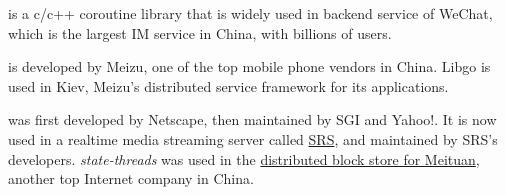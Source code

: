 \cite{libco} is a c/c++ coroutine library that
is widely used in backend service of WeChat, which is the largest IM service
in China, with billions of users. 

\uabschnitt{\libgo}\cite{libgo} is developed by Meizu, one of the top mobile
phone vendors in China. Libgo is used in Kiev, Meizu's distributed service
framework for its applications.

\uabschnitt{\statethreads}\cite{state-threads} was first developed by
Netscape, then maintained by SGI and Yahoo!. It is now used in a realtime
media streaming server called \href{https://github.com/ossrs/srs}{SRS}, and
maintained by SRS's developers. \emph{state-threads} was used in the
\href{https://dl.acm.org/doi/10.1145/3302424.3303967}
{distributed block store for Meituan}, another top Internet company in China.

